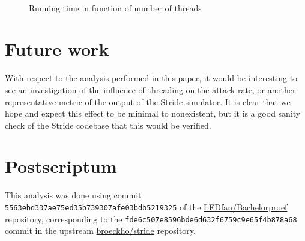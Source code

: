 \documentclass{acmart}
\begin{document}
\begin{figure}
{{   		}%
   	}\\
   	\caption{Running time in function of number of threads}
   	
\end{figure}

\section{Future work}

With respect to the analysis performed in this paper, it would be interesting to see an investigation of the influence of threading on the attack rate, or another representative metric of the output of the Stride simulator. It is clear that we hope and expect this effect to be minimal to nonexistent, but it is a good sanity check of the Stride codebase that this would be verified.

\section{Postscriptum}

This analysis was done using commit \texttt{5563ebd337ae75ed35b739307afe03bdb5219325} of the \href{https://github.com/LEDfan/Bachelorproef}{LEDfan/Bachelorproef} repository, corresponding to the \texttt{fde6c507e8596bde6d632f6759c9e65f4b878a68} commit in the upstream \href{https://github.com/broeckho/stride}{broeckho/stride} repository.

\clearpage



\end{document}
